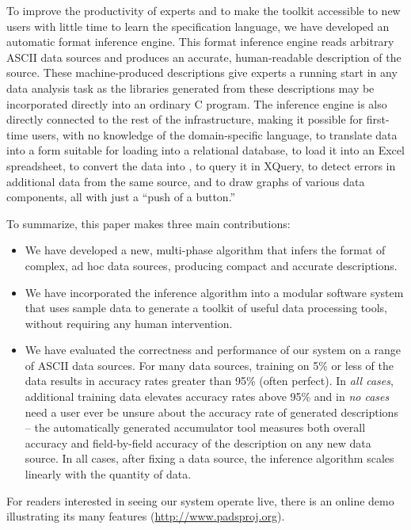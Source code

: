 To improve the productivity of experts and to 
make the \pads{} toolkit accessible to new users with 
little time to learn the specification language,
we have developed an automatic format inference engine.
This format inference engine reads arbitrary ASCII data sources
and produces an accurate, human-readable \pads{} description of the source.
These machine-produced descriptions give experts a running start
in any data analysis task as the libraries generated from these
descriptions may be incorporated directly into an ordinary C program.
The inference engine is also directly connected to the rest of the
\pads{} infrastructure, making it possible for first-time users,
with no knowledge of the \pads{} domain-specific language, 
to translate data into a form suitable for loading into a relational database, 
to load it into an Excel spreadsheet,
to convert the data into \xml{},
to query it in XQuery,
to detect errors in additional data from the same source,
and to draw graphs of various data components, all
with just a ``push of a button.''

To summarize, this paper makes three main contributions:
\begin{itemize}
\item We have developed a new, multi-phase algorithm 
that infers the format of complex, ad hoc data sources,
producing compact and accurate \pads{} descriptions.

\item We have incorporated the inference algorithm into 
a modular software system that uses sample data to
generate a toolkit of useful data processing tools,
without requiring any human intervention.
 
\item We have evaluated the correctness and performance of
our system on a range of ASCII data sources.  For many data
sources, training on 5\% or less of the data results in
accuracy rates greater than 95\% (often perfect).  
In {\em all cases}, additional
training data elevates accuracy rates above 95\% and
in {\em no cases} need a user ever be unsure about the
accuracy rate of generated descriptions -- the automatically
generated accumulator tool measures both overall accuracy
and field-by-field accuracy of the description on any new
data source.
In all cases, after fixing a data source, the 
inference algorithm scales linearly with the quantity of
data.
\end{itemize}
\noindent
For readers interested in seeing our system operate live, 
there is an online demo illustrating its many features
(\url{http://www.padsproj.org}).  


